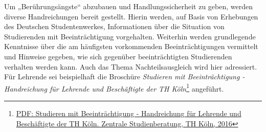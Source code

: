 Um „Berührungsängste`` abzubauen und Handlungssicherheit zu geben,
werden diverse Handreichungen bereit gestellt. Hierin werden, auf Basis
von Erhebungen des Deutschen Studentenwerkes, Informationen über die
Situation von Studierenden mit Beeinträchtigung vorgehalten. Weiterhin
werden grundlegende Kenntnisse über die am häufigsten vorkommenden
Beeinträchtigungen vermittelt und Hinweise gegeben, wie sich gegenüber
beeinträchtigten Studierenden verhalten werden kann. Auch das Thema
Nachteilsausgleich wird hier adressiert. Für Lehrende sei beispielhaft
die Broschüre \emph{Studieren mit Beeinträchtigung - Handreichung für
Lehrende und Beschäftigte der TH Köln}\footnote{\href{https://www.th-koeln.de/mam/downloads/deutsch/studium/beratung/beeintraechtigung/a5brosch__re_beeintr__chtigung_2016.pdf}{PDF:
  Studieren mit Beeinträchtigung - Handreichung für Lehrende und
  Beschäftigte der TH Köln. Zentrale Studienberatung, TH Köln, 2016}}
angeführt.
